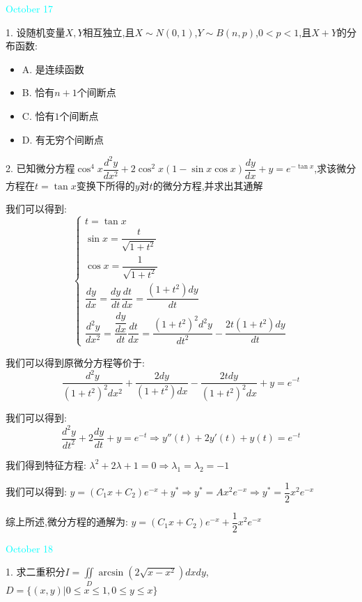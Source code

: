 \textcolor{cyan}{October 17}

1. 设随机变量$X,Y$相互独立,且$X\sim N(0,1)$,$Y\sim B(n,p)$,$0<p<1$,且$X+Y$的分布函数:  
\begin{itemize}
	\item A. 是连续函数
	\item B. 恰有$n+1$个间断点
	\item C. 恰有$1$个间断点
	\item D. 有无穷个间断点
\end{itemize}

\begin{solution}
	
\end{solution}


2. 已知微分方程$\cos^4 x\dfrac{d^2y}{dx^2}+2\cos^2 x(1-\sin x\cos x)\dfrac{dy}{dx}+y=e^{-\tan x}$,求该微分方程在$t=\tan x$变换下所得的$y$对$t$的微分方程,并求出其通解


\begin{solution}

	我们可以得到:  $$\left\lbrace
	\begin{array}{l}
		t=\tan x\\
		\sin x=\dfrac{t}{\sqrt{1+t^2}}\\
		\cos x=\dfrac{1}{\sqrt{1+t^2}}\\
		\dfrac{dy}{dx}=\dfrac{dy}{dt}\dfrac{dt}{dx}=\dfrac{(1+t^2)dy}{dt}\\
		\dfrac{d^2y}{dx^2}=\dfrac{\dfrac{dy}{dx}}{dt}\dfrac{dt}{dx}=\dfrac{(1+t^2)^2d^2y}{dt^2}-\dfrac{2t(1+t^2)dy}{dt}
	\end{array}
	\right. $$
	
	我们可以得到原微分方程等价于:  
	$$\dfrac{d^2y}{(1+t^2)^2dx^2}+\dfrac{2dy}{(1+t^2)dx}-\dfrac{2tdy}{(1+t^2)^2dx}+y=e^{-t}$$
	
	我们可以得到:  
	$$\dfrac{d^2y}{dt^2}+2\dfrac{dy}{dt}+y=e^{-t}\Rightarrow y''(t)+2y'(t)+y(t)=e^{-t}$$
	
	我们得到特征方程:  $\lambda^2+2\lambda+1=0\Rightarrow \lambda_{1}=\lambda_{2}=-1$
	
	我们可以得到:  $y=(C_{1}x+C_{2})e^{-x}+y^{*}\Rightarrow y^{*}=Ax^2e^{-x}\Rightarrow y^{*}=\dfrac{1}{2}x^2e^{-x}$
	
	综上所述,微分方程的通解为:  $y=(C_{1}x+C_{2})e^{-x}+\dfrac{1}{2}x^2e^{-x}$
\end{solution}


\textcolor{cyan}{October 18}

1. 求二重积分$I=\iint\limits_{D}\arcsin(2\sqrt{x-x^2})dxdy$,$D=\{(x,y)|0\leq x\leq 1,0\leq y\leq x\}$



